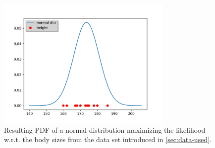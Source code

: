 \documentclass{article}
\begin{document}
\begin{figure}
\centering
  \centerline{\includegraphics[width=8.5cm]{img/project1/plot2}}
\caption{Resulting PDF of a normal distribution maximizing the likelihood w.r.t. the body sizes from the data set introduced in \ref{sec:data-used}.}
\label{fig:body-normal}
\end{figure}
\end{document}
